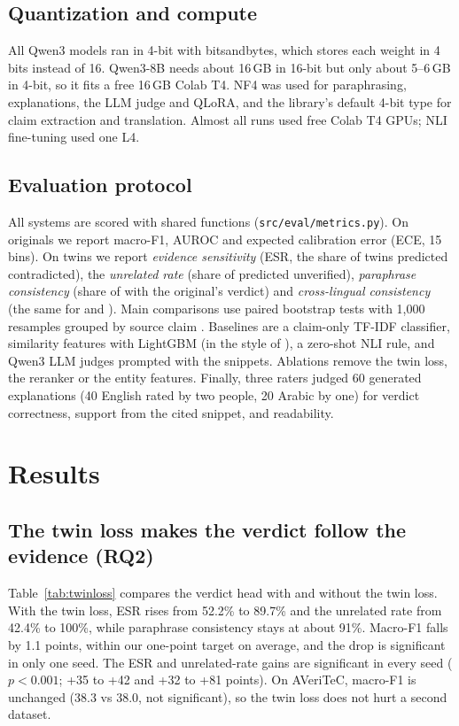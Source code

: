 \subsection{Quantization and compute}
All Qwen3 models ran in 4-bit with bitsandbytes, which stores each weight in 4 bits instead of 16. Qwen3-8B needs about 16\,GB in 16-bit but only about 5--6\,GB in 4-bit, so it fits a free 16\,GB Colab T4. NF4 was used for paraphrasing, explanations, the LLM judge and QLoRA, and the library's default 4-bit type for claim extraction and translation. Almost all runs used free Colab T4 GPUs; NLI fine-tuning used one L4.

\subsection{Evaluation protocol}
All systems are scored with shared functions (\texttt{src/eval/metrics.py}). On originals we report macro-F1, AUROC and expected calibration error (ECE, 15 bins). On twins we report \emph{evidence sensitivity} (ESR, the share of  twins predicted contradicted), the \emph{unrelated rate} (share of  predicted unverified), \emph{paraphrase consistency} (share of  with the original's verdict) and \emph{cross-lingual consistency} (the same for  and ). Main comparisons use paired bootstrap tests with 1,000 resamples grouped by source claim \citep{efron1993bootstrap}. Baselines are a claim-only TF-IDF classifier, similarity features with LightGBM (in the style of \citet{papadopoulos2025similarity}), a zero-shot NLI rule, and Qwen3 LLM judges prompted with the snippets. Ablations remove the twin loss, the reranker or the entity features. Finally, three raters judged 60 generated explanations (40 English rated by two people, 20 Arabic by one) for verdict correctness, support from the cited snippet, and readability.

\section{Results}

\subsection{The twin loss makes the verdict follow the evidence (RQ2)}
Table~\ref{tab:twinloss} compares the verdict head with and without the twin loss. With the twin loss, ESR rises from 52.2\% to 89.7\% and the unrelated rate from 42.4\% to 100\%, while paraphrase consistency stays at about 91\%. Macro-F1 falls by 1.1 points, within our one-point target on average, and the drop is significant in only one seed. The ESR and unrelated-rate gains are significant in every seed ($p<0.001$; +35 to +42 and +32 to +81 points). On AVeriTeC, macro-F1 is unchanged (38.3 vs 38.0, not significant), so the twin loss does not hurt a second dataset.

